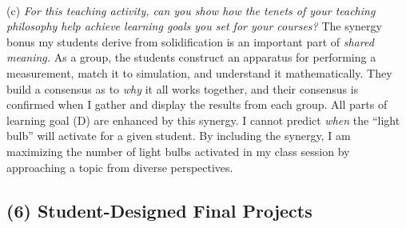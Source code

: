 \documentclass[../../../main.tex]{subfiles}
\begin{document}
\\
\vspace{0.15cm}
(c) \textit{For this teaching activity, can you show how the tenets of your teaching philosophy help achieve learning goals you set for your courses?}  The synergy bonus my students derive from solidification is an important part of \textit{shared meaning.}  As a group, the students construct an apparatus for performing a measurement, match it to simulation, and understand it mathematically.  They build a consensus as to \textit{why} it all works together, and their consensus is confirmed when I gather and display the results from each group.  All parts of learning goal (D) are enhanced by this synergy.  I cannot predict \textit{when} the ``light bulb'' will activate for a given student.  By including the synergy, I am maximizing the number of light bulbs activated in my class session by approaching a topic from diverse perspectives.

\subsection{(6) Student-Designed Final Projects}
\end{document}
